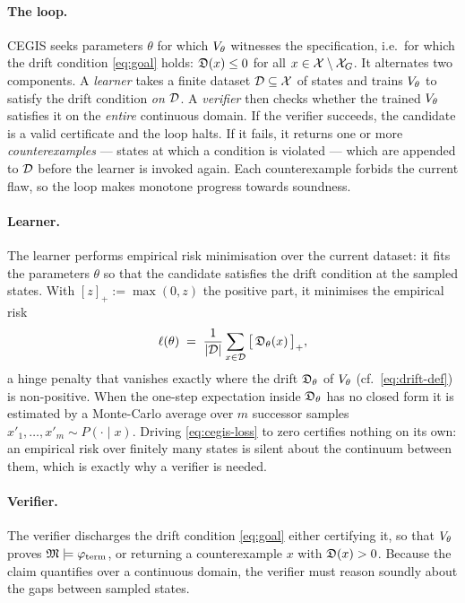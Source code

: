 \paragraph{The loop.} CEGIS seeks parameters $\theta$ for which $V_\theta$
witnesses the specification, i.e.\ for which the drift condition
\eqref{eq:goal} holds: $\mathfrak{D}(x) \le 0$ for all $x \in \mathcal{X} \setminus \mathcal{X}_G$. It
alternates two components. A \emph{learner} takes a finite dataset
$\mathcal{D} \subseteq \mathcal{X}$ of states and trains $V_\theta$ to satisfy the drift
condition \emph{on $\mathcal{D}$}. A \emph{verifier} then checks whether the trained
$V_\theta$ satisfies it on the \emph{entire} continuous domain. If the verifier succeeds, the candidate is a valid certificate
and the loop halts. If it fails, it returns one or more \emph{counterexamples}
--- states at which a condition is violated --- which are appended to $\mathcal{D}$
before the learner is invoked again. Each counterexample forbids the current
flaw, so the loop makes monotone progress towards soundness.

\paragraph{Learner.} The learner performs empirical risk minimisation over the
current dataset: it fits the parameters $\theta$ so that the candidate satisfies
the drift condition at the sampled states. With $[z]_+ := \max(0, z)$ the
positive part, it minimises the empirical risk
%
\begin{equation}
    \ell(\theta) \;=\; \frac{1}{|\mathcal{D}|} \sum_{x \in \mathcal{D}} \big[\, \mathfrak{D}_\theta(x) \,\big]_+ ,
    \label{eq:cegis-loss}
\end{equation}
%
a hinge penalty that vanishes exactly where the drift $\mathfrak{D}_\theta$ of
$V_\theta$ (cf.\ \eqref{eq:drift-def}) is non-positive. When the one-step
expectation inside $\mathfrak{D}_\theta$ has no closed form it is estimated by a
Monte-Carlo average over $m$ successor samples $x'_1, \dots, x'_m \sim P(\cdot
\mid x)$. Driving \eqref{eq:cegis-loss} to zero certifies nothing on its own: an
empirical risk over finitely many states is silent about the continuum between
them, which is exactly why a verifier is needed.

\paragraph{Verifier.} The verifier discharges the drift condition \eqref{eq:goal}
 either certifying it, so that $V_\theta$ proves $\mathfrak{M} \models \varphi_{\mathrm{term}}$, or
returning a counterexample $x$ with $\mathfrak{D}(x) > 0$. Because the claim quantifies
over a continuous domain, the verifier must reason soundly about the gaps between
sampled states.



